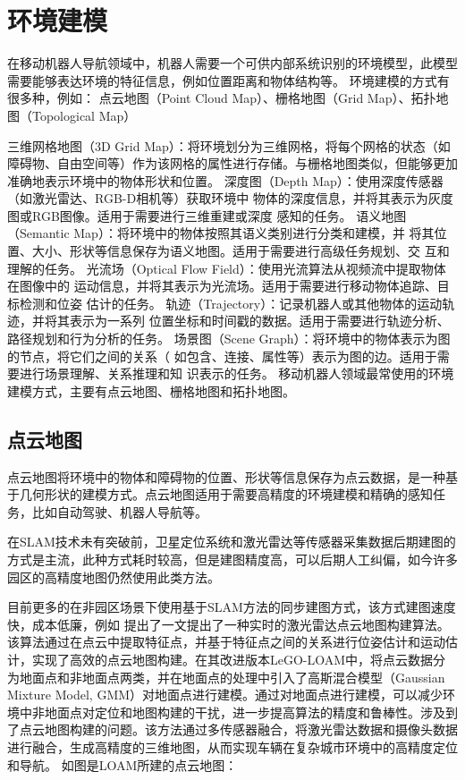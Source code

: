 \section{环境建模}
在移动机器人导航领域中，机器人需要一个可供内部系统识别的环境模型，此模型
需要能够表达环境的特征信息，例如位置距离和物体结构等。
环境建模的方式有很多种，例如：
点云地图（Point Cloud Map）、栅格地图（Grid Map）、拓扑地图（Topological Map）

三维网格地图（3D Grid Map）：将环境划分为三维网格，将每个网格的状态（如
障碍物、自由空间等）作为该网格的属性进行存储。与栅格地图类似，但能够更加
准确地表示环境中的物体形状和位置。
深度图（Depth Map）：使用深度传感器（如激光雷达、RGB-D相机等）获取环境中
物体的深度信息，并将其表示为灰度图或RGB图像。适用于需要进行三维重建或深度
感知的任务。
语义地图（Semantic Map）：将环境中的物体按照其语义类别进行分类和建模，并
将其位置、大小、形状等信息保存为语义地图。适用于需要进行高级任务规划、交
互和理解的任务。
光流场（Optical Flow Field）：使用光流算法从视频流中提取物体在图像中的
运动信息，并将其表示为光流场。适用于需要进行移动物体追踪、目标检测和位姿
估计的任务。
轨迹（Trajectory）：记录机器人或其他物体的运动轨迹，并将其表示为一系列
位置坐标和时间戳的数据。适用于需要进行轨迹分析、路径规划和行为分析的任务。
场景图（Scene Graph）：将环境中的物体表示为图的节点，将它们之间的关系（
如包含、连接、属性等）表示为图的边。适用于需要进行场景理解、关系推理和知
识表示的任务。
移动机器人领域最常使用的环境建模方式，主要有点云地图、栅格地图和拓扑地图。

\subsection{点云地图}
点云地图将环境中的物体和障碍物的位置、形状等信息保存为点云数据，是一种基
于几何形状的建模方式。点云地图适用于需要高精度的环境建模和精确的感知任务，比如自动驾驶、机器人导航等。

在SLAM技术未有突破前，卫星定位系统和激光雷达等传感器采集数据后期建图的方式是主流，此种方式耗时较高，但是建图精度高，可以后期人工纠偏，如今许多园区的高精度地图仍然使用此类方法。

目前更多的在非园区场景下使用基于SLAM方法的同步建图方式，该方式建图速度快，成本低廉，例如\citet{zhang2014loam} 提出了一文提出了一种实时的激光雷达点云地图构建算法。该算法通过在点云中提取特征点，并基于特征点之间的关系进行位姿估计和运动估计，实现了高效的点云地图构建。在其改进版本LeGO-LOAM中，\citet{shan2018lego}将点云数据分为地面点和非地面点两类，并在地面点的处理中引入了高斯混合模型（Gaussian Mixture Model, GMM）对地面点进行建模。通过对地面点进行建模，可以减少环境中非地面点对定位和地图构建的干扰，进一步提高算法的精度和鲁棒性。\citet{wan2018robust}涉及到了点云地图构建的问题。该方法通过多传感器融合，将激光雷达数据和摄像头数据进行融合，生成高精度的三维地图，从而实现车辆在复杂城市环境中的高精度定位和导航。
如图是LOAM所建的点云地图：

